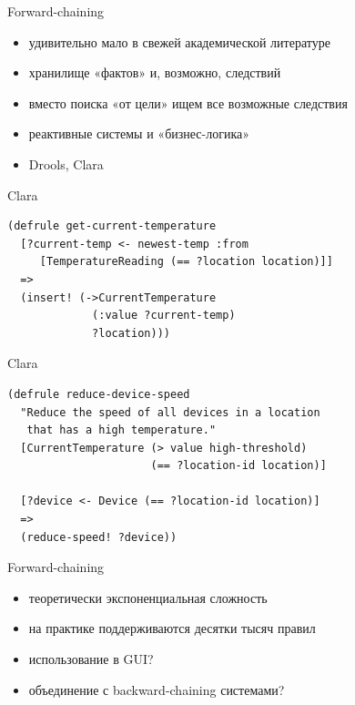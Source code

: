 \documentclass[10pt]{beamer}
\begin{document}
\begin{frame}{Forward-chaining}
  \begin{itemize}
  \item удивительно мало в свежей академической литературе
  \item хранилище «фактов» и, возможно, следствий
  \item вместо поиска «от цели» ищем все возможные следствия
  \item реактивные системы и «бизнес-логика»
  \item Drools, Clara
  \end{itemize}
\end{frame}

\begin{frame}[fragile]{Clara}
  \begin{verbatim}
(defrule get-current-temperature
  [?current-temp <- newest-temp :from
     [TemperatureReading (== ?location location)]]
  =>
  (insert! (->CurrentTemperature
             (:value ?current-temp)
             ?location)))
  \end{verbatim}
\end{frame}

\begin{frame}[fragile]{Clara}
  \begin{verbatim}
(defrule reduce-device-speed
  "Reduce the speed of all devices in a location
   that has a high temperature."
  [CurrentTemperature (> value high-threshold)
                      (== ?location-id location)]

  [?device <- Device (== ?location-id location)]
  =>
  (reduce-speed! ?device))
  \end{verbatim}
\end{frame}

\begin{frame}{Forward-chaining}
  \begin{itemize}
  \item теоретически экспоненциальная сложность
  \item на практике поддерживаются десятки тысяч правил
  \item использование в GUI?
  \item объединение с backward-chaining системами?
  \end{itemize}
\end{frame}
\end{document}

